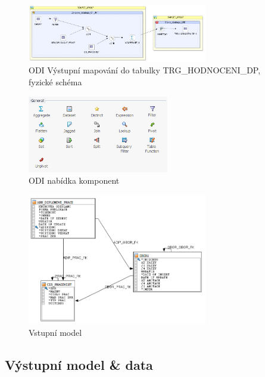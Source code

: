 \begin{figure}[htb]
    \centering
    \includegraphics[width=0.7\textwidth]{graphs/odi-mapping-trg-hodnoceni-dp-physical.png}
    \caption{ODI Výstupní mapování do tabulky TRG\_HODNOCENI\_DP, fyzické schéma}
    \label{fig:odi-mapping-trg-hodnoceni-physical}
\end{figure}
\FloatBarrier

\begin{figure}[htb]
    \centering
    \includegraphics[width=0.55\textwidth]{graphs/odi-transformation-components.png}
    \caption{ODI nabídka komponent}
    \label{fig:odi-transformation-components}
\end{figure}
\FloatBarrier

\begin{figure}[htb]
    \centering
    \includegraphics[width=0.7\textwidth]{graphs/src-model.png}
    \caption{Vstupní model}
    \label{fig:src-model}
\end{figure}
\FloatBarrier

\subsection{Výstupní model \& data}

